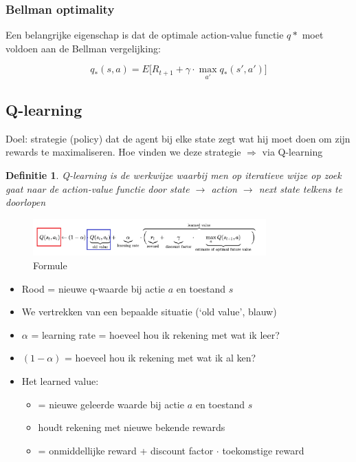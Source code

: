 \documentclass{article}
\newtheorem{theorem}{Definitie}[section]
\begin{document}
\subsubsection{Bellman optimality}

Een belangrijke eigenschap is dat de optimale action-value functie $q*$
moet voldoen aan de Bellman vergelijking:

\begin{equation}
    q_* (s,a) = E \Big[ R_{t+1} + \gamma \cdot \max_{a'} q_* (s', a')\Big]
\end{equation}

\subsection{Q-learning}

Doel: strategie (policy) dat de agent bij elke state zegt wat hij moet doen om zijn
rewards te maximaliseren. Hoe vinden we deze strategie $\Rightarrow$ via Q-learning

\begin{theorem}
    Q-learning is de werkwijze waarbij men op iteratieve wijze op zoek gaat naar
    de action-value functie door state $\rightarrow$ action $\rightarrow$ next state
    telkens te doorlopen
\end{theorem}

\begin{figure}[H]
    \centering
    \includegraphics[width=0.8\textwidth]{q-learning.png}
    \caption{Formule}
\end{figure}

\begin{itemize}
    \item Rood = nieuwe q-waarde bij actie $a$ en toestand $s$
    \item We vertrekken van een bepaalde situatie (`old value', blauw)
    \item $\alpha$ = learning rate = hoeveel hou ik rekening met wat ik leer?
    \item $(1-\alpha)$ = hoeveel hou ik rekening met wat ik al ken?
    \item Het learned value:
    \begin{itemize}
        \item = nieuwe geleerde waarde bij actie $a$ en toestand $s$
        \item houdt rekening met nieuwe bekende rewards
        \item = onmiddellijke reward + discount factor $\cdot$ toekomstige reward 
    \end{itemize}
\end{itemize}
\end{document}
